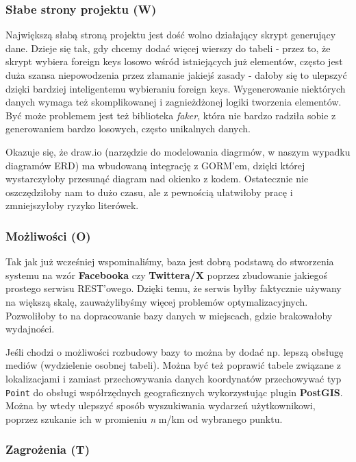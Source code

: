 \documentclass{article}
\begin{document}
\subsubsection{Słabe strony projektu (W)}

Największą słabą stroną projektu jest dość wolno działający skrypt generujący dane. Dzieje się tak, gdy chcemy dodać więcej wierszy do tabeli - przez to, że skrypt wybiera foreign keys losowo wśród istniejących już elementów, często jest duża szansa niepowodzenia przez złamanie jakiejś zasady - dałoby się to ulepszyć dzięki bardziej inteligentemu wybieraniu foreign keys. Wygenerowanie niektórych danych wymaga też skomplikowanej i zagnieżdżonej logiki tworzenia elementów. Być może problemem jest też biblioteka \textit{faker}, która nie bardzo radziła sobie z generowaniem bardzo losowych, często unikalnych danych. 

Okazuje się, że draw.io (narzędzie do modelowania diagrmów, w naszym wypadku diagramów ERD) ma wbudowaną integrację z GORM'em, dzięki której wystarczyłoby przesunąć diagram nad okienko z kodem. Ostatecznie nie oszczędziłoby nam to dużo czasu, ale z pewnością ułatwiłoby pracę i zmniejszyłoby ryzyko literówek.

\subsubsection{Możliwości (O)}

Tak jak już wcześniej wspominaliśmy, baza jest dobrą podstawą do stworzenia systemu na wzór \textbf{Facebooka} czy \textbf{Twittera/X} poprzez zbudowanie jakiegoś prostego serwisu REST'owego. Dzięki temu, że serwis byłby faktycznie używany na większą skalę, zauważylibyśmy więcej problemów optymalizacyjnych. Pozwoliłoby to na dopracowanie bazy danych w miejscach, gdzie brakowałoby wydajności.

Jeśli chodzi o możliwości rozbudowy bazy to można by dodać np. lepszą obsługę mediów (wydzielenie osobnej tabeli). Można być też poprawić tabele związane z lokalizacjami i zamiast przechowywania danych koordynatów przechowywać typ \texttt{Point} do obsługi współrzędnych geograficznych wykorzystując plugin \textbf{PostGIS}. Można by wtedy ulepszyć sposób wyszukiwania wydarzeń użytkownikowi, poprzez szukanie ich w promieniu \textit{n} m/km od wybranego punktu.

\subsubsection{Zagrożenia (T)}
\end{document}
